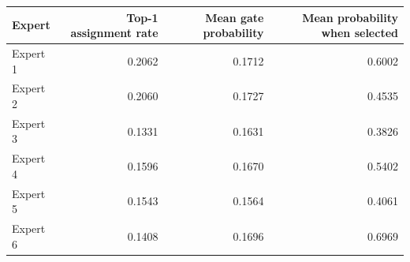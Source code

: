 \begin{tabular}{lrrr}
\toprule
Expert & Top-1 assignment rate & Mean gate probability & Mean probability when selected \\
\midrule
Expert 1 & 0.2062 & 0.1712 & 0.6002 \\
Expert 2 & 0.2060 & 0.1727 & 0.4535 \\
Expert 3 & 0.1331 & 0.1631 & 0.3826 \\
Expert 4 & 0.1596 & 0.1670 & 0.5402 \\
Expert 5 & 0.1543 & 0.1564 & 0.4061 \\
Expert 6 & 0.1408 & 0.1696 & 0.6969 \\
\bottomrule
\end{tabular}
